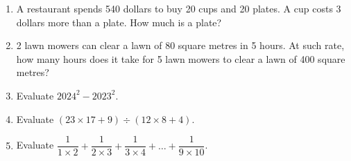 \documentclass[11pt]{scrartcl}
\begin{document}
\begin{enumerate}
    \vspace{10cm} \item A restaurant spends 540 dollars to buy 20 cups and 20 plates. A cup costs 3 dollars more than a plate. How much is a plate?
    \vspace{10cm} \item 2 lawn mowers can clear a lawn of 80 square metres in 5 hours. At such rate, how many hours does it take for 5 lawn mowers to clear a lawn of 400 square metres?
    \vspace{10cm} \item Evaluate $2024^2-2023^2$.
    \vspace{10cm} \item Evaluate $(23 \times 17 + 9) \div (12 \times 8 + 4).$
    \vspace{10cm} \item Evaluate $\dfrac{1}{1 \times 2} + \dfrac{1}{2 \times 3} + \dfrac{1}{3 \times 4} + \dots + \dfrac{1}{9 \times 10}$.

    \vspace{10cm} 

\end{enumerate}
\end{document}
